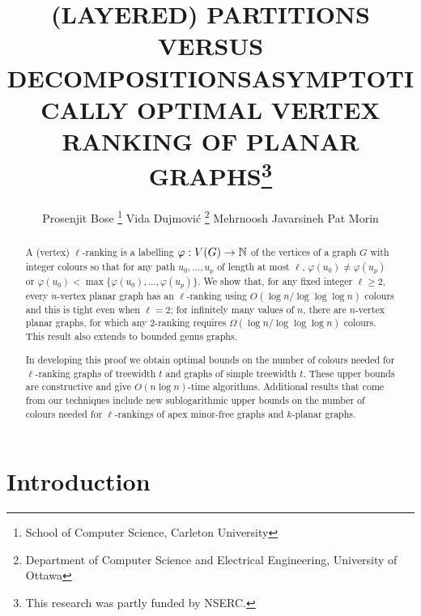 \documentclass[kpfonts]{patmorin}
\title{\MakeUppercase{(Layered) Partitions versus Decompositions}}
\author{}
\title{\MakeUppercase{Asymptotically Optimal Vertex Ranking of Planar Graphs}\thanks{This research was partly funded by NSERC.}}
\author{Prosenjit Bose%
    \thanks{School of Computer Science, Carleton University}\quad
    Vida Dujmović%
    \thanks{Department of Computer Science and Electrical Engineering, University of Ottawa}\quad
    Mehrnoosh Javarsineh\footnotemark[2]  \quad
    Pat Morin\footnotemark[2]}
\theoremstyle{named}
\begin{document}
\begin{titlepage}
\maketitle

\begin{abstract}
  A (vertex) $\ell$-ranking is a labelling $\varphi:V(G)\to\mathbb{N}$ of the vertices of a graph $G$ with integer colours so that for any path $u_0,\ldots,u_p$ of length at most $\ell$, $\varphi(u_0)\neq\varphi(u_p)$ or $\varphi(u_0)<\max\{\varphi(u_0),\ldots,\varphi(u_p)\}$.  We show that, for any fixed integer $\ell\ge 2$, every $n$-vertex planar graph has an $\ell$-ranking using $O(\log n/\log\log\log n)$ colours and this is tight even when $\ell=2$; for infinitely many values of $n$, there are $n$-vertex planar graphs, for which any 2-ranking requires $\Omega(\log n/\log\log\log n)$ colours.  This result also extends to bounded genus graphs.

  In developing this proof we obtain optimal bounds on the number of colours needed for $\ell$-ranking graphs of treewidth $t$ and graphs of simple treewidth $t$.  These upper bounds are constructive and give $O(n\log n)$-time algorithms.  Additional results that come from our techniques include new sublogarithmic upper bounds on the number of colours needed for $\ell$-rankings of apex minor-free graphs and $k$-planar graphs.
\end{abstract}
\end{titlepage}

%
{}

\section{Introduction}

\end{document}

